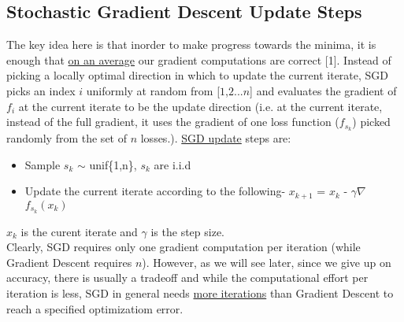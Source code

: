 \documentclass[12pt]{report}
\begin{document}
\subsection{Stochastic Gradient Descent Update Steps}
The key idea here is that inorder to make progress towards the minima, it is enough that \underline{on an average} our gradient computations are correct [1]. Instead of picking a locally optimal direction in which to update the current iterate, SGD picks an index $i$ uniformly at random from [$1$,$2$...$n$] and evaluates the gradient of $f_i$ at the current iterate to be the update direction (i.e. at the current iterate, instead of the full gradient, it uses the gradient of one loss function ($f_{s_{k}}$) picked randomly from the set of $n$ losses.). \underline{SGD update} steps are:

\begin{itemize}
    \item Sample $s_k$ $\sim$ unif\{1,n\}, $s_k$ are i.i.d 
    \item Update the current iterate according to the following- 
$x_{k+1}$ = $x_{k}$ - $\gamma \nabla$ $f_{s_k}(x_k)$  
\end{itemize}

$x_{k}$ is the curent iterate and $\gamma$ is the step size.\\

Clearly, SGD requires only one gradient computation per iteration (while Gradient Descent requires $n$). However, as we will see later, since we give up on accuracy, there is usually a tradeoff and while the computational effort per iteration is less, SGD in general needs \underline{more iterations} than Gradient Descent to reach a specified optimizatiom error.

$\>$
\end{document}
